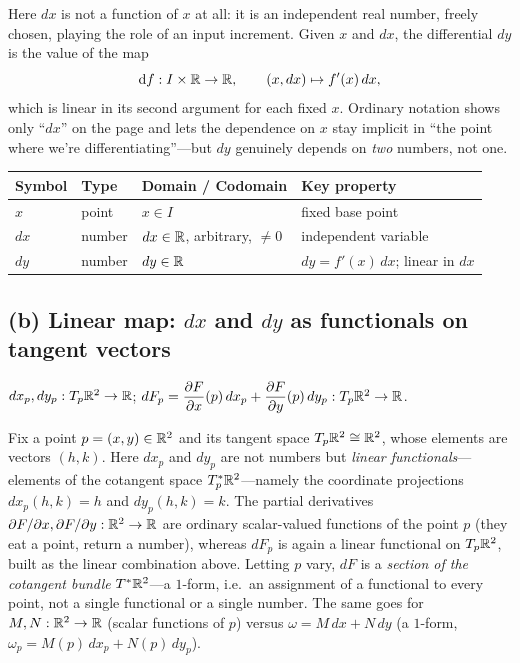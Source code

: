 \documentclass{essay}
\begin{document}
Here \(dx\) is not a function of \(x\) at all: it is an independent real number, freely chosen, playing the role of an input increment. Given \(x\) and \(dx\), the differential \(dy\) is the value of the map
\[ \mathrm{d}f : I \times \mathbb{R} \to \mathbb{R}, \qquad (x, dx) \mapsto f'(x)\,dx, \]
which is linear in its second argument for each fixed \(x\). Ordinary notation shows only ``\(dx\)'' on the page and lets the dependence on \(x\) stay implicit in ``the point where we're differentiating''---but \(dy\) genuinely depends on \emph{two} numbers, not one.

\begin{center}
  \renewcommand{\arraystretch}{1.35}
  \begin{tabular}{@{}l l l l@{}}
    \toprule
    \textbf{Symbol} & \textbf{Type} & \textbf{Domain / Codomain} & \textbf{Key property} \\
    \midrule
    \(x\)  & point   & \(x \in I\)                     & fixed base point \\
    \(dx\) & number  & \(dx \in \mathbb{R}\), arbitrary, \(\neq 0\) & independent variable \\
    \(dy\) & number  & \(dy \in \mathbb{R}\)                    & \(dy = f'(x)\,dx\); linear in \(dx\) \\
    \bottomrule
  \end{tabular}
\end{center}

\subsection*{(b) Linear map: \(dx\) and \(dy\) as functionals on tangent vectors}

\begin{signature}
  \(dx_{p}, dy_{p} : T_{p}\mathbb{R}^{2} \to \mathbb{R}\); \quad \(dF_{p} = \dfrac{\partial F}{\partial x}(p)\,dx_{p} + \dfrac{\partial F}{\partial y}(p)\,dy_{p} : T_{p}\mathbb{R}^{2} \to \mathbb{R}\).
\end{signature}

Fix a point \(p = (x,y) \in \mathbb{R}^{2}\) and its tangent space \(T_{p}\mathbb{R}^{2} \cong \mathbb{R}^{2}\), whose elements are vectors \((h,k)\). Here \(dx_{p}\) and \(dy_{p}\) are not numbers but \emph{linear functionals}---elements of the cotangent space \(T_{p}^*\mathbb{R}^{2}\)---namely the coordinate projections \(dx_{p}(h,k) = h\) and \(dy_{p}(h,k) = k\). The partial derivatives \(\partial F/\partial x, \partial F/\partial y : \mathbb{R}^{2} \to \mathbb{R}\) are ordinary scalar-valued functions of the point \(p\) (they eat a point, return a number), whereas \(dF_{p}\) is again a linear functional on \(T_{p}\mathbb{R}^{2}\), built as the linear combination above. Letting \(p\) vary, \(dF\) is a \emph{section of the cotangent bundle} \(T^*\mathbb{R}^{2}\)---a \(1\)-form, i.e.\ an assignment of a functional to every point, not a single functional or a single number. The same goes for \(M, N : \mathbb{R}^{2} \to \mathbb{R}\) (scalar functions of \(p\)) versus \(\omega = M\,dx + N\,dy\) (a \(1\)-form, \(\omega_{p} = M(p)\,dx_{p} + N(p)\,dy_{p}\)).
\end{document}
